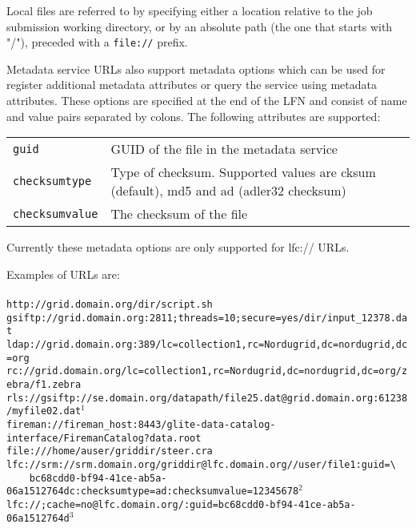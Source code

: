 Local files are referred to by specifying either a location relative
to the job submission working directory, or by an absolute path (the
one that starts with "/"), preceded with a \verb#file://# prefix.

Metadata service URLs also support metadata options which can be used
for register additional metadata attributes or query the service using
metadata attributes. These options are specified at the end of the LFN
and consist of name and value pairs separated by colons. The following
attributes are supported:

\begin{tabular}{lp{10cm}}
   \verb#guid# & GUID of the file in the metadata service \\
   \verb#checksumtype# & Type of checksum. Supported values are cksum
   (default), md5 and ad (adler32 checksum) \\
   \verb#checksumvalue# & The checksum of the file \\
\end{tabular}

Currently these metadata options are only supported for lfc:// URLs.

\begin{framed}
   Examples of URLs are:\\
   \\
   \verb#http://grid.domain.org/dir/script.sh#\\
   \verb#gsiftp://grid.domain.org:2811;threads=10;secure=yes/dir/input_12378.dat#\\
   \verb#ldap://grid.domain.org:389/lc=collection1,rc=Nordugrid,dc=nordugrid,dc=org#\\
   \verb#rc://grid.domain.org/lc=collection1,rc=Nordugrid,dc=nordugrid,dc=org/zebra/f1.zebra#\\
   \verb#rls://gsiftp://se.domain.org/datapath/file25.dat@grid.domain.org:61238/myfile02.dat#$^1$\\
   \verb#fireman://fireman_host:8443/glite-data-catalog-interface/FiremanCatalog?data.root#\\
   \verb#file:///home/auser/griddir/steer.cra#\\
   \verb#lfc://srm://srm.domain.org/griddir@lfc.domain.org//user/file1:guid=\# \\
   \verb#    bc68cdd0-bf94-41ce-ab5a-06a1512764dc:checksumtype=ad:checksumvalue=12345678#$^2$\\
   \verb#lfc://;cache=no@lfc.domain.org/:guid=bc68cdd0-bf94-41ce-ab5a-06a1512764d#$^3$\\
\end{framed}

